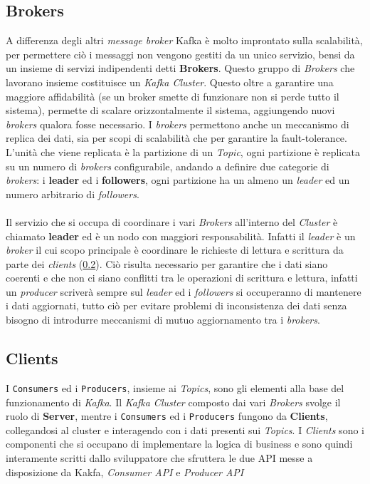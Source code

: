 \subsection{Brokers}
\label{subsec:kafka_brokers}
A differenza degli altri \textit{message broker} Kafka è molto improntato sulla scalabilità, per permettere ciò i  messaggi non vengono gestiti da un unico servizio,
bensi da un insieme di servizi indipendenti detti \textbf{Brokers}. Questo gruppo di \textit{Brokers} che lavorano insieme costituisce un \textit{Kafka Cluster}.
Questo oltre a garantire una maggiore affidabilità (se un broker smette di funzionare non si perde tutto il sistema), 
permette di scalare orizzontalmente il sistema, aggiungendo nuovi \textit{brokers} qualora fosse necessario.
I \textit{brokers} permettono anche un meccanismo di replica dei dati, sia per scopi di scalabilità che per garantire la fault-tolerance.
L'unità che viene replicata è la partizione di un \textit{Topic}, ogni partizione è replicata su un numero di \textit{brokers} configurabile,
andando a definire due categorie di \textit{brokers}: i \textbf{leader} ed i \textbf{followers}, 
ogni partizione ha un almeno un \textit{leader} ed un numero arbitrario di \textit{followers}.\\\\
Il servizio che si occupa di coordinare i vari \textit{Brokers} all'interno del \textit{Cluster} è chiamato \textbf{leader} ed è un nodo con maggiori responsabilità.
Infatti il \textit{leader} è un \textit{broker} il cui scopo principale è coordinare le richieste di lettura e scrittura da parte dei \textit{clients} (\ref{subsec:kakfa_clients}).
Ciò risulta necessario per garantire che i dati siano coerenti e che non ci siano conflitti tra le operazioni di scrittura e lettura,
infatti un \textit{producer} scriverà sempre sul \textit{leader} ed i \textit{followers} si occuperanno di mantenere i dati aggiornati,
tutto ciò per evitare problemi di inconsistenza dei dati senza bisogno di introdurre meccanismi di mutuo aggiornamento tra i \textit{brokers}. 

\subsection{Clients}
\label{subsec:kakfa_clients}
I \texttt{Consumers} ed i \texttt{Producers}, insieme ai \textit{Topics}, sono gli elementi alla base del funzionamento di \textit{Kafka}.
Il \textit{Kafka Cluster} composto dai vari \textit{Brokers} svolge il ruolo di \textbf{Server}, mentre i \texttt{Consumers} ed i \texttt{Producers} fungono da \textbf{Clients},
collegandosi al cluster e interagendo con i dati presenti sui \textit{Topics}.
I \textit{Clients} sono i componenti che si occupano di implementare la logica di business e sono quindi interamente scritti dallo sviluppatore che sfruttera le due API messe a disposizione da Kakfa,
\textit{Consumer API} e \textit{Producer API}

